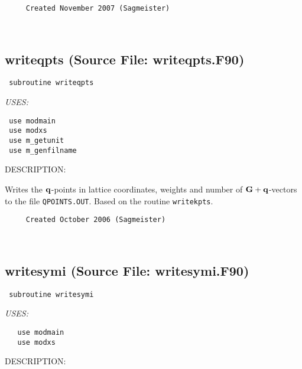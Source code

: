 \documentclass[11pt]{article}
\begin{document}
\begin{verbatim}     Created November 2007 (Sagmeister)\end{verbatim}


 
 
\mbox{}\hrulefill\ 
 
\subsection{writeqpts (Source File: writeqpts.F90)}


\begin{verbatim} subroutine writeqpts\end{verbatim}{\em USES:}
\begin{verbatim} use modmain
 use modxs
 use m_getunit
 use m_genfilname\end{verbatim}
{\sf DESCRIPTION:\\ }


     Writes the ${\bf q}$-points in lattice coordinates, weights and number of
     ${\bf G+q}$-vectors to the file {\tt QPOINTS.OUT}. Based on the routine 
     {\tt writekpts}.
  
\begin{verbatim}     Created October 2006 (Sagmeister)\end{verbatim}






 
 
\mbox{}\hrulefill\ 
 
\subsection{writesymi (Source File: writesymi.F90)}


\begin{verbatim} subroutine writesymi\end{verbatim}{\em USES:}
\begin{verbatim}   use modmain
   use modxs\end{verbatim}
{\sf DESCRIPTION:\\ }
\end{document}
